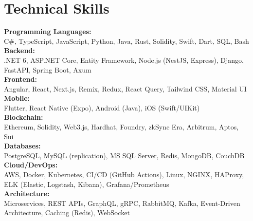 \section{Technical Skills}
 \begin{itemize}[leftmargin=0.15in, label={}]
    \small{\item{
     \textbf{Programming Languages:} \\
     \quad \textbullet{} C\#, TypeScript, JavaScript, Python, Java, Rust, Solidity, Swift, Dart, SQL, Bash \\ \vspace{2pt}
     \textbf{Backend:} \\
     \quad \textbullet{} .NET 6, ASP.NET Core, Entity Framework, Node.js (NestJS, Express), Django, FastAPI, Spring Boot, Axum \\ \vspace{2pt}
     \textbf{Frontend:} \\
     \quad \textbullet{} Angular, React, Next.js, Remix, Redux, React Query, Tailwind CSS, Material UI \\ \vspace{2pt}
     \textbf{Mobile:} \\
     \quad \textbullet{} Flutter, React Native (Expo), Android (Java), iOS (Swift/UIKit) \\ \vspace{2pt}
     \textbf{Blockchain:} \\
     \quad \textbullet{} Ethereum, Solidity, Web3.js, Hardhat, Foundry, zkSync Era, Arbitrum, Aptos, Sui \\ \vspace{2pt}
     \textbf{Databases:} \\
     \quad \textbullet{} PostgreSQL, MySQL (replication), MS SQL Server, Redis, MongoDB, CouchDB \\ \vspace{2pt}
     \textbf{Cloud/DevOps:} \\
     \quad \textbullet{} AWS, Docker, Kubernetes, CI/CD (GitHub Actions), Linux, NGINX, HAProxy, ELK (Elastic, Logstash, Kibana), Grafana/Prometheus \\ \vspace{2pt}
     \textbf{Architecture:} \\
     \quad \textbullet{} Microservices, REST APIs, GraphQL, gRPC, RabbitMQ, Kafka, Event-Driven Architecture, Caching (Redis), WebSocket \\ \vspace{2pt}
}}
\end{itemize}

